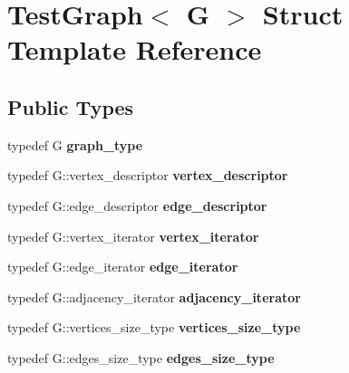 \hypertarget{structTestGraph}{\section{\-Test\-Graph$<$ \-G $>$ \-Struct \-Template \-Reference}
\label{structTestGraph}
}
\subsection*{\-Public \-Types}
\begin{DoxyCompactItemize}
\item 
\hypertarget{structTestGraph_a149d9d185e2299b108590e2f83804351}{typedef \-G {\bfseries graph\-\_\-type}}\label{structTestGraph_a149d9d185e2299b108590e2f83804351}

\item 
\hypertarget{structTestGraph_aa82e61846643af7ce36a6993b81b9aa3}{typedef \-G\-::vertex\-\_\-descriptor {\bfseries vertex\-\_\-descriptor}}\label{structTestGraph_aa82e61846643af7ce36a6993b81b9aa3}

\item 
\hypertarget{structTestGraph_aa20b87dd86a6d46d79cd5eead7e3ecd8}{typedef \-G\-::edge\-\_\-descriptor {\bfseries edge\-\_\-descriptor}}\label{structTestGraph_aa20b87dd86a6d46d79cd5eead7e3ecd8}

\item 
\hypertarget{structTestGraph_ae82be295babd001adfdf636fc39a79f8}{typedef \-G\-::vertex\-\_\-iterator {\bfseries vertex\-\_\-iterator}}\label{structTestGraph_ae82be295babd001adfdf636fc39a79f8}

\item 
\hypertarget{structTestGraph_a4a62a3acea29caad985cde5504e4222d}{typedef \-G\-::edge\-\_\-iterator {\bfseries edge\-\_\-iterator}}\label{structTestGraph_a4a62a3acea29caad985cde5504e4222d}

\item 
\hypertarget{structTestGraph_af50caf6f726568b4165d4a1dc5b75cc3}{typedef \-G\-::adjacency\-\_\-iterator {\bfseries adjacency\-\_\-iterator}}\label{structTestGraph_af50caf6f726568b4165d4a1dc5b75cc3}

\item 
\hypertarget{structTestGraph_a808d6ca09652f1c14f6a68ca42beb447}{typedef \-G\-::vertices\-\_\-size\-\_\-type {\bfseries vertices\-\_\-size\-\_\-type}}\label{structTestGraph_a808d6ca09652f1c14f6a68ca42beb447}

\item 
\hypertarget{structTestGraph_a308c6aa7034bf56790d592b0fc259851}{typedef \-G\-::edges\-\_\-size\-\_\-type {\bfseries edges\-\_\-size\-\_\-type}}\label{structTestGraph_a308c6aa7034bf56790d592b0fc259851}


\end{DoxyCompactItemize}
